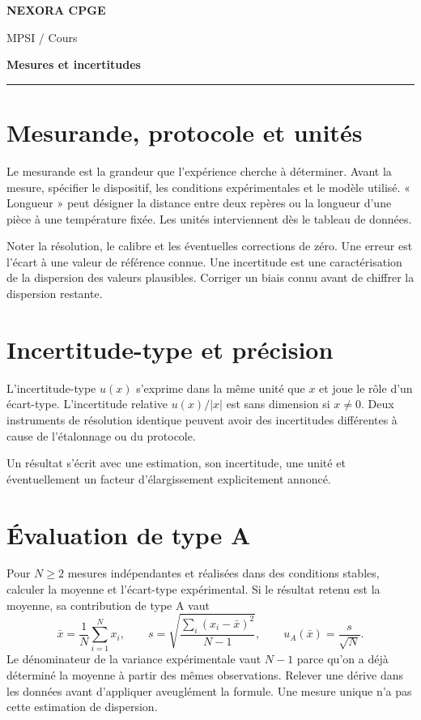 \documentclass[11pt,a4paper]{article}
\begin{document}
{\small\bfseries\color{nexorablue} NEXORA CPGE}\par
{\small MPSI / Cours}\par
{\LARGE\bfseries Mesures et incertitudes}\par
\vspace{0.25em}\hrule\vspace{0.6em}

\section*{Mesurande, protocole et unités}
Le mesurande est la grandeur que l’expérience cherche à déterminer. Avant la mesure, spécifier le dispositif, les conditions expérimentales et le modèle utilisé. « Longueur » peut désigner la distance entre deux repères ou la longueur d’une pièce à une température fixée. Les unités interviennent dès le tableau de données.

Noter la résolution, le calibre et les éventuelles corrections de zéro. Une erreur est l’écart à une valeur de référence connue. Une incertitude est une caractérisation de la dispersion des valeurs plausibles. Corriger un biais connu avant de chiffrer la dispersion restante.

\section*{Incertitude-type et précision}
L’incertitude-type $u(x)$ s’exprime dans la même unité que $x$ et joue le rôle d’un écart-type. L’incertitude relative $u(x)/|x|$ est sans dimension si $x\ne0$. Deux instruments de résolution identique peuvent avoir des incertitudes différentes à cause de l’étalonnage ou du protocole.

Un résultat s’écrit avec une estimation, son incertitude, une unité et éventuellement un facteur d’élargissement explicitement annoncé.

\section*{Évaluation de type A}
Pour $N\ge2$ mesures indépendantes et réalisées dans des conditions stables, calculer la moyenne et l’écart-type expérimental. Si le résultat retenu est la moyenne, sa contribution de type A vaut
\[ \bar x=\frac1N\sum_{i=1}^N x_i,\qquad
s=\sqrt{\frac{\sum_i(x_i-\bar x)^2}{N-1}},\qquad
u_A(\bar x)=\frac{s}{\sqrt N}. \]
Le dénominateur de la variance expérimentale vaut $N-1$ parce qu’on a déjà déterminé la moyenne à partir des mêmes observations. Relever une dérive dans les données avant d’appliquer aveuglément la formule. Une mesure unique n’a pas cette estimation de dispersion.
\end{document}
